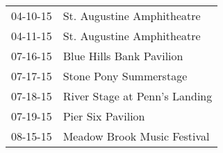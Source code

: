 \begin{supertabular}{p{0.07\textwidth}p{0.23\textwidth}}
 04-10-15 &     St. Augustine Amphitheatre \\
 04-11-15 &     St. Augustine Amphitheatre \\
 07-16-15 &       Blue Hills Bank Pavilion \\
 07-17-15 &         Stone Pony Summerstage \\
 07-18-15 &  River Stage at Penn's Landing \\
 07-19-15 &              Pier Six Pavilion \\
 08-15-15 &    Meadow Brook Music Festival \\
\end{supertabular}
